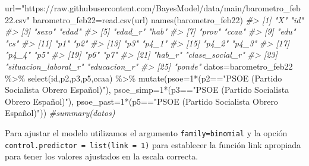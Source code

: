 \documentclass[
]{book}
\newenvironment{Shaded}{\begin{snugshade}}{\end{snugshade}}
\newcommand{\AttributeTok}[1]{\textcolor[rgb]{0.77,0.63,0.00}{#1}}
\newcommand{\CommentTok}[1]{\textcolor[rgb]{0.56,0.35,0.01}{\textit{#1}}}
\newcommand{\DecValTok}[1]{\textcolor[rgb]{0.00,0.00,0.81}{#1}}
\newcommand{\FunctionTok}[1]{\textcolor[rgb]{0.00,0.00,0.00}{#1}}
\newcommand{\NormalTok}[1]{#1}
\newcommand{\OtherTok}[1]{\textcolor[rgb]{0.56,0.35,0.01}{#1}}
\newcommand{\SpecialCharTok}[1]{\textcolor[rgb]{0.00,0.00,0.00}{#1}}
\newcommand{\StringTok}[1]{\textcolor[rgb]{0.31,0.60,0.02}{#1}}
\begin{document}
\begin{Shaded}
\begin{Highlighting}[]
\NormalTok{url}\OtherTok{=}\StringTok{"https://raw.githubusercontent.com/BayesModel/data/main/barometro\_feb22.csv"}
\NormalTok{barometro\_feb22}\OtherTok{=}\FunctionTok{read.csv}\NormalTok{(url)}
\FunctionTok{names}\NormalTok{(barometro\_feb22)}
\CommentTok{\#\textgreater{}  [1] "X"                   "id"                 }
\CommentTok{\#\textgreater{}  [3] "sexo"                "edad"               }
\CommentTok{\#\textgreater{}  [5] "edad\_r"              "hab"                }
\CommentTok{\#\textgreater{}  [7] "prov"                "ccaa"               }
\CommentTok{\#\textgreater{}  [9] "edu"                 "cs"                 }
\CommentTok{\#\textgreater{} [11] "p1"                  "p2"                 }
\CommentTok{\#\textgreater{} [13] "p3"                  "p4\_1"               }
\CommentTok{\#\textgreater{} [15] "p4\_2"                "p4\_3"               }
\CommentTok{\#\textgreater{} [17] "p4\_4"                "p5"                 }
\CommentTok{\#\textgreater{} [19] "p6"                  "p7"                 }
\CommentTok{\#\textgreater{} [21] "hab\_r"               "clase\_social\_r"     }
\CommentTok{\#\textgreater{} [23] "situacion\_laboral\_r" "educacion\_r"        }
\CommentTok{\#\textgreater{} [25] "ponde"}
\NormalTok{datos}\OtherTok{=}\NormalTok{barometro\_feb22 }\SpecialCharTok{\%\textgreater{}\%}
  \FunctionTok{select}\NormalTok{(id,p2,p3,p5,ccaa) }\SpecialCharTok{\%\textgreater{}\%}
  \FunctionTok{mutate}\NormalTok{(}\AttributeTok{psoe=}\DecValTok{1}\SpecialCharTok{*}\NormalTok{(p2}\SpecialCharTok{==}\StringTok{"PSOE (Partido Socialista Obrero Español)"}\NormalTok{),}
         \AttributeTok{psoe\_simp=}\DecValTok{1}\SpecialCharTok{*}\NormalTok{(p3}\SpecialCharTok{==}\StringTok{"PSOE (Partido Socialista Obrero Español)"}\NormalTok{),}
         \AttributeTok{psoe\_past=}\DecValTok{1}\SpecialCharTok{*}\NormalTok{(p5}\SpecialCharTok{==}\StringTok{"PSOE (Partido Socialista Obrero Español)"}\NormalTok{)) }
\CommentTok{\#summary(datos)}
\end{Highlighting}
\end{Shaded}

Para ajustar el modelo utilizamos el argumento \texttt{family=binomial} y la opción \texttt{control.predictor\ =\ list(link\ =\ 1)} para establecer la función link apropiada para tener los valores ajustados en la escala correcta.
\end{document}
